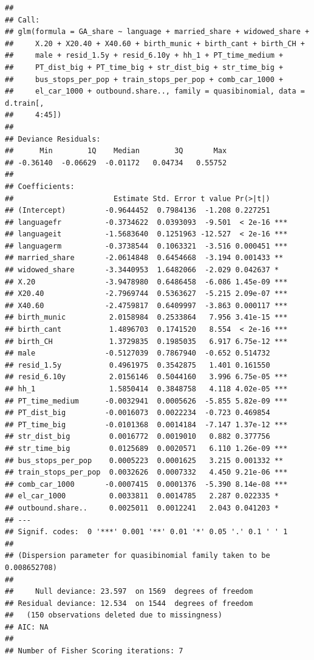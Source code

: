 \documentclass[
]{article}
\begin{document}
\begin{verbatim}
## 
## Call:
## glm(formula = GA_share ~ language + married_share + widowed_share + 
##     X.20 + X20.40 + X40.60 + birth_munic + birth_cant + birth_CH + 
##     male + resid_1.5y + resid_6.10y + hh_1 + PT_time_medium + 
##     PT_dist_big + PT_time_big + str_dist_big + str_time_big + 
##     bus_stops_per_pop + train_stops_per_pop + comb_car_1000 + 
##     el_car_1000 + outbound.share.., family = quasibinomial, data = d.train[, 
##     4:45])
## 
## Deviance Residuals: 
##      Min        1Q    Median        3Q       Max  
## -0.36140  -0.06629  -0.01172   0.04734   0.55752  
## 
## Coefficients:
##                       Estimate Std. Error t value Pr(>|t|)    
## (Intercept)         -0.9644452  0.7984136  -1.208 0.227251    
## languagefr          -0.3734622  0.0393093  -9.501  < 2e-16 ***
## languageit          -1.5683640  0.1251963 -12.527  < 2e-16 ***
## languagerm          -0.3738544  0.1063321  -3.516 0.000451 ***
## married_share       -2.0614848  0.6454668  -3.194 0.001433 ** 
## widowed_share       -3.3440953  1.6482066  -2.029 0.042637 *  
## X.20                -3.9478980  0.6486458  -6.086 1.45e-09 ***
## X20.40              -2.7969744  0.5363627  -5.215 2.09e-07 ***
## X40.60              -2.4759817  0.6409997  -3.863 0.000117 ***
## birth_munic          2.0158984  0.2533864   7.956 3.41e-15 ***
## birth_cant           1.4896703  0.1741520   8.554  < 2e-16 ***
## birth_CH             1.3729835  0.1985035   6.917 6.75e-12 ***
## male                -0.5127039  0.7867940  -0.652 0.514732    
## resid_1.5y           0.4961975  0.3542875   1.401 0.161550    
## resid_6.10y          2.0156146  0.5044160   3.996 6.75e-05 ***
## hh_1                 1.5850414  0.3848758   4.118 4.02e-05 ***
## PT_time_medium      -0.0032941  0.0005626  -5.855 5.82e-09 ***
## PT_dist_big         -0.0016073  0.0022234  -0.723 0.469854    
## PT_time_big         -0.0101368  0.0014184  -7.147 1.37e-12 ***
## str_dist_big         0.0016772  0.0019010   0.882 0.377756    
## str_time_big         0.0125689  0.0020571   6.110 1.26e-09 ***
## bus_stops_per_pop    0.0005223  0.0001625   3.215 0.001332 ** 
## train_stops_per_pop  0.0032626  0.0007332   4.450 9.21e-06 ***
## comb_car_1000       -0.0007415  0.0001376  -5.390 8.14e-08 ***
## el_car_1000          0.0033811  0.0014785   2.287 0.022335 *  
## outbound.share..     0.0025011  0.0012241   2.043 0.041203 *  
## ---
## Signif. codes:  0 '***' 0.001 '**' 0.01 '*' 0.05 '.' 0.1 ' ' 1
## 
## (Dispersion parameter for quasibinomial family taken to be 0.008652708)
## 
##     Null deviance: 23.597  on 1569  degrees of freedom
## Residual deviance: 12.534  on 1544  degrees of freedom
##   (150 observations deleted due to missingness)
## AIC: NA
## 
## Number of Fisher Scoring iterations: 7
\end{verbatim}
\end{document}
